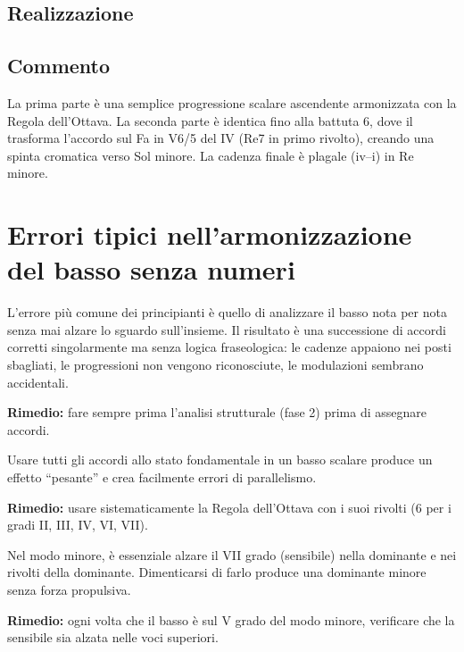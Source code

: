 \subsection{Realizzazione}



\subsection{Commento}

La prima parte è una semplice progressione scalare ascendente armonizzata con la Regola dell'Ottava. La seconda parte è identica fino alla battuta 6, dove il \Fadiesis{} trasforma l'accordo sul Fa in V6/5 del IV (Re7 in primo rivolto), creando una spinta cromatica verso Sol minore. La cadenza finale è plagale (iv--i) in Re minore.

\section{Errori tipici nell'armonizzazione del basso senza numeri}
\label{sec:errori_tipici}

\begin{errore}
	\label{err:nota_per_nota}
	L'errore più comune dei principianti è quello di analizzare il basso nota per nota senza mai alzare lo sguardo sull'insieme. Il risultato è una successione di accordi corretti singolarmente ma senza logica fraseologica: le cadenze appaiono nei posti sbagliati, le progressioni non vengono riconosciute, le modulazioni sembrano accidentali.
	
	\textbf{Rimedio:} fare sempre prima l'analisi strutturale (fase 2) prima di assegnare accordi.
\end{errore}

\begin{errore}
	\label{err:troppi_fondamentali}
	Usare tutti gli accordi allo stato fondamentale in un basso scalare produce un effetto ``pesante'' e crea facilmente errori di parallelismo.
	
	\textbf{Rimedio:} usare sistematicamente la Regola dell'Ottava con i suoi rivolti (6 per i gradi II, III, IV, VI, VII).
\end{errore}

\begin{errore}
	\label{err:sensibile_minore}
	Nel modo minore, è essenziale alzare il VII grado (sensibile) nella dominante e nei rivolti della dominante. Dimenticarsi di farlo produce una dominante minore senza forza propulsiva.
	
	\textbf{Rimedio:} ogni volta che il basso è sul V grado del modo minore, verificare che la sensibile sia alzata nelle voci superiori.
\end{errore}

